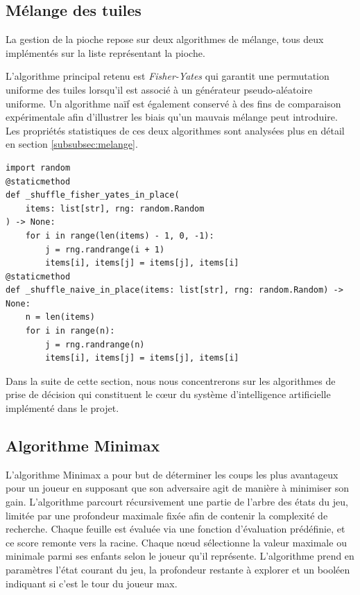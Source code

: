 \documentclass[11pt]{article}
\begin{document}
\subsection{Mélange des tuiles}

La gestion de la pioche repose sur deux algorithmes de mélange, tous 
deux implémentés sur la liste représentant la pioche.

L'algorithme principal retenu est \textit{Fisher-Yates}\cite{fisher_yates} 
qui garantit une permutation uniforme des tuiles lorsqu'il est associé 
à un générateur pseudo-aléatoire uniforme. Un algorithme naïf est 
également conservé à des fins de comparaison expérimentale afin 
d'illustrer les biais qu'un mauvais mélange peut introduire. Les 
propriétés statistiques de ces deux algorithmes sont analysées plus 
en détail en section \ref{subsubsec:melange}.

{\normalsize
  \begin{verbatim}
import random
@staticmethod
def _shuffle_fisher_yates_in_place(
    items: list[str], rng: random.Random
) -> None:
    for i in range(len(items) - 1, 0, -1):
        j = rng.randrange(i + 1)
        items[i], items[j] = items[j], items[i]
@staticmethod
def _shuffle_naive_in_place(items: list[str], rng: random.Random) -> None:
    n = len(items)
    for i in range(n):
        j = rng.randrange(n)
        items[i], items[j] = items[j], items[i]
  \end{verbatim}
}

Dans la suite de cette section, nous nous concentrerons sur les 
algorithmes de prise de décision qui constituent le cœur du système 
d'intelligence artificielle implémenté dans le projet.


\subsection{Algorithme Minimax}
\label{subsec:minimax}

L'algorithme Minimax a pour but de déterminer les coups les plus 
avantageux pour un joueur en supposant que son adversaire agit de 
manière à minimiser son gain. L'algorithme parcourt 
récursivement une partie de l'arbre des états du jeu, limitée par une 
profondeur maximale fixée afin de contenir la complexité de recherche. 
Chaque feuille est évaluée via une fonction d'évaluation prédéfinie, 
et ce score remonte vers la racine. Chaque nœud sélectionne la valeur 
maximale ou minimale parmi ses enfants selon le joueur qu'il représente. 
L'algorithme prend en paramètres l'état courant du jeu, la profondeur 
restante à explorer et un booléen indiquant si c'est le tour du joueur 
max.
\end{document}
